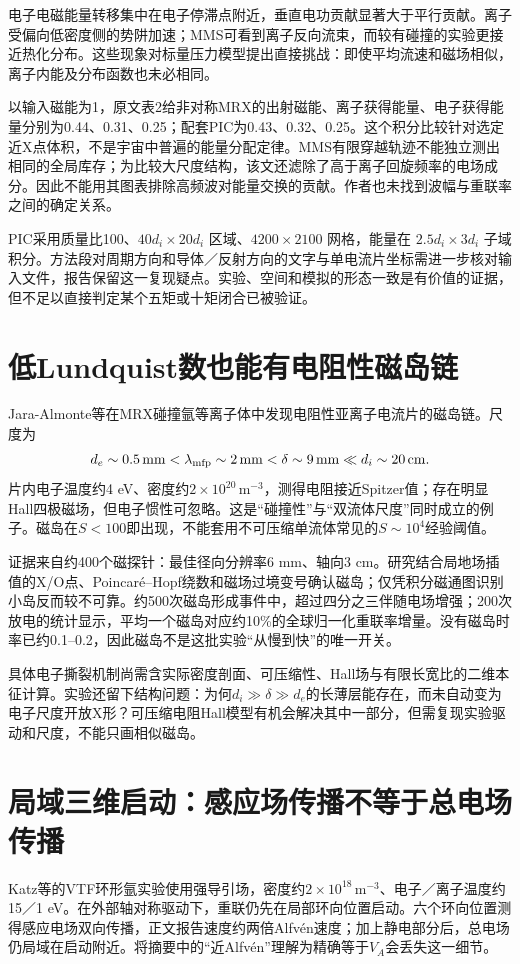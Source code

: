 \documentclass[UTF8,a4paper,11pt,openany,fontset=fandol]{ctexbook}
\begin{document}
电子电磁能量转移集中在电子停滞点附近，垂直电功贡献显著大于平行贡献。离子受偏向低密度侧的势阱加速；MMS可看到离子反向流束，而较有碰撞的实验更接近热化分布。这些现象对标量压力模型提出直接挑战：即使平均流速和磁场相似，离子内能及分布函数也未必相同。

以输入磁能为1，原文表2给非对称MRX的出射磁能、离子获得能量、电子获得能量分别为0.44、0.31、0.25；配套PIC为0.43、0.32、0.25。这个积分比较针对选定近X点体积，不是宇宙中普遍的能量分配定律。MMS有限穿越轨迹不能独立测出相同的全局库存；为比较大尺度结构，该文还滤除了高于离子回旋频率的电场成分。因此不能用其图表排除高频波对能量交换的贡献。作者也未找到波幅与重联率之间的确定关系。

PIC采用质量比100、$40d_i\times20d_i$ 区域、$4200\times2100$ 网格，能量在 $2.5d_i\times3d_i$ 子域积分。方法段对周期方向和导体／反射方向的文字与单电流片坐标需进一步核对输入文件，报告保留这一复现疑点。实验、空间和模拟的形态一致是有价值的证据，但不足以直接判定某个五矩或十矩闭合已被验证。

\section{低Lundquist数也能有电阻性磁岛链}
Jara-Almonte等在MRX碰撞氩等离子体中发现电阻性亚离子电流片的磁岛链。尺度为
\begin{equation*}
 d_e\sim0.5\,\mathrm{mm}<\lambda_{\rm mfp}\sim2\,\mathrm{mm}
 <\delta\sim9\,\mathrm{mm}\ll d_i\sim20\,\mathrm{cm}.
\end{equation*}
片内电子温度约4 eV、密度约$2\times10^{20}\,\mathrm m^{-3}$，测得电阻接近Spitzer值；存在明显Hall四极磁场，但电子惯性可忽略。这是“碰撞性”与“双流体尺度”同时成立的例子。磁岛在$S<100$即出现，不能套用不可压缩单流体常见的$S\sim10^4$经验阈值。\citep{E448}

证据来自约400个磁探针：最佳径向分辨率6 mm、轴向3 cm。研究结合局地场插值的X/O点、Poincar\'e--Hopf绕数和磁场过境变号确认磁岛；仅凭积分磁通图识别小岛反而较不可靠。约500次磁岛形成事件中，超过四分之三伴随电场增强；200次放电的统计显示，平均一个磁岛对应约10\%的全球归一化重联率增量。没有磁岛时率已约0.1--0.2，因此磁岛不是这批实验“从慢到快”的唯一开关。

具体电子撕裂机制尚需含实际密度剖面、可压缩性、Hall场与有限长宽比的二维本征计算。实验还留下结构问题：为何$ d_i\gg\delta\gg d_e$的长薄层能存在，而未自动变为电子尺度开放X形？可压缩电阻Hall模型有机会解决其中一部分，但需复现实验驱动和尺度，不能只画相似磁岛。

\section{局域三维启动：感应场传播不等于总电场传播}
Katz等的VTF环形氩实验使用强导引场，密度约$2\times10^{18}\,\mathrm m^{-3}$、电子／离子温度约15／1 eV。在外部轴对称驱动下，重联仍先在局部环向位置启动。六个环向位置测得感应电场双向传播，正文报告速度约两倍Alfvén速度；加上静电部分后，总电场仍局域在启动附近。将摘要中的“近Alfvén”理解为精确等于$V_A$会丢失这一细节。\citep{Katz2010}
\end{document}

